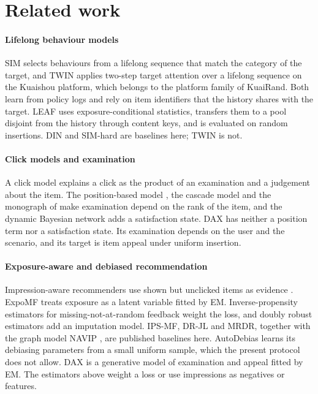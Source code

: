 \documentclass[preprint,12pt,authoryear]{elsarticle}
\begin{document}
\section{Related work}
\label{sec:related}

\paragraph{Lifelong behaviour models} SIM \citep{pi2020sim} selects behaviours from a lifelong sequence that match the category of
the target, and TWIN \citep{chang2023twin} applies two-step target attention over a lifelong sequence on the Kuaishou platform,
which belongs to the platform family of KuaiRand. Both learn from policy logs and rely on item identifiers that the history shares
with the target. LEAF uses exposure-conditional statistics, transfers them to a pool disjoint from the history through content keys,
and is evaluated on random insertions. DIN \citep{zhou2018din} and SIM-hard are baselines here; TWIN is not.

\paragraph{Click models and examination} A click model explains a click as the product of an examination and a judgement about the
item. The position-based model \citep{richardson2007predicting}, the cascade model \citep{craswell2008cascade} and the monograph of
\citet{chuklin2015clickmodels} make examination depend on the rank of the item, and the dynamic Bayesian network
\citep{chapelle2009dbn} adds a satisfaction state. DAX has neither a position term nor a satisfaction state. Its examination depends
on the user and the scenario, and its target is item appeal under uniform insertion.

\paragraph{Exposure-aware and debiased recommendation} Impression-aware recommenders use shown but unclicked items as evidence
\citep{perezmaurera2025iars}. ExpoMF \citep{liang2016exposure} treats exposure as a latent variable fitted by EM. Inverse-propensity
estimators for missing-not-at-random feedback \citep{saito2020unbiased,joachims2017unbiased,schnabel2016} weight the loss, and doubly
robust estimators \citep{wang2019drjl,guo2021mrdr} add an imputation model. IPS-MF, DR-JL and MRDR, together with the graph model NAVIP
\citep{kim2022navip}, are published baselines here. AutoDebias \citep{chen2021autodebias} learns its debiasing parameters from a small
uniform sample, which the present protocol does not allow. DAX is a generative model of examination and appeal fitted by EM. The
estimators above weight a loss or use impressions as negatives or features.
\end{document}
